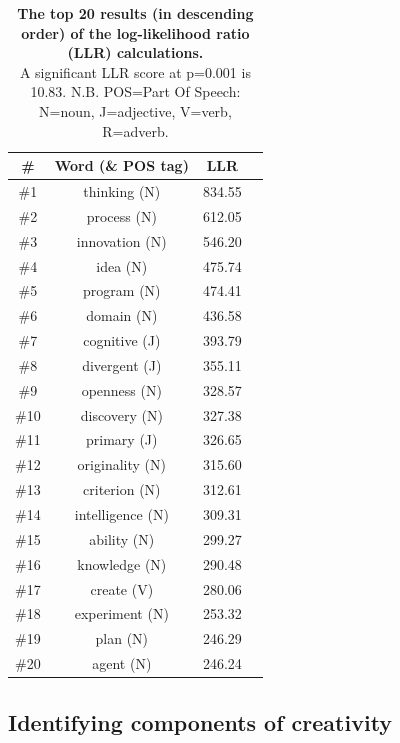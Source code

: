 \documentclass[10pt,letterpaper]{article}
\begin{document}
\begin{table}[!b]
\begin{center}
\begin{tabular}{c c | c c}
\# & Word (\& POS tag) & LLR \\
\hline
\#1 & thinking (N) & 834.55  \\
\#2 & process (N) & 612.05 \\
\#3 & innovation (N) & 546.20 \\
\#4 & idea (N) & 475.74  \\
\#5 & program (N) & 474.41  \\
\#6 & domain (N) & 436.58 \\
\#7 & cognitive (J) & 393.79  \\
\#8 & divergent (J) & 355.11 \\
\#9 & openness (N) & 328.57  \\
\#10 & discovery (N) & 327.38 \\
\#11 & primary (J) & 326.65 \\
\#12 & originality (N) & 315.60  \\
\#13 & criterion (N) & 312.61  \\
\#14 & intelligence (N) & 309.31 \\
\#15 & ability (N) & 299.27 \\
\#16 & knowledge (N) & 290.48  \\
\#17 & create (V) & 280.06 \\
\#18 & experiment (N) & 253.32 \\
\#19 & plan (N) & 246.29 \\
\#20 & agent (N) & 246.24  \\
\end{tabular}
\end{center}
\caption{{\bf The top 20 results (in descending order) of the log-likelihood ratio (LLR) calculations.}\\ A significant LLR score at p=0.001 is 10.83. N.B. POS=Part Of Speech: N=noun, J=adjective, V=verb, R=adverb.}
\label{creativityTop20}
\end{table}%


\subsection*{Identifying components of creativity}
\label{creat-comps}
\end{document}
